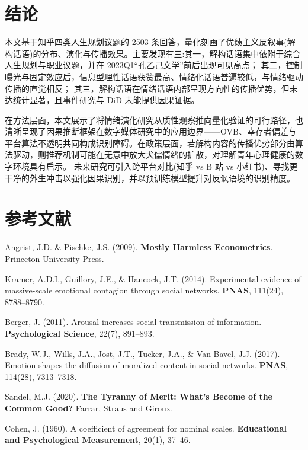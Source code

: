 \documentclass[11pt,a4paper]{ctexart}
\begin{document}
\section{结论}

本文基于知乎四类人生规划议题的 2503 条回答，量化刻画了优绩主义反叙事(解构话语)的分布、演化与传播效果。主要发现有三:其一，解构话语集中依附于综合人生规划与职业议题，并在 2023Q1“孔乙己文学”前后出现可见高点；
其二，控制曝光与固定效应后，信息型理性话语获赞最高、情绪化话语普遍较低，与情绪驱动传播的直觉相反；
其三，解构话语在情绪话语内部呈现方向性的传播优势，但未达统计显著，且事件研究与 DiD 未能提供因果证据。

在方法层面，本文展示了将情绪演化研究从质性观察推向量化验证的可行路径，也清晰呈现了因果推断框架在数字媒体研究中的应用边界——OVB、幸存者偏差与平台算法不透明共同构成识别障碍。在政策层面，若解构内容的传播优势部分由算法驱动，则推荐机制可能在无意中放大犬儒情绪的扩散，对理解青年心理健康的数字环境具有启示。
未来研究可引入跨平台对比(知乎 vs B 站 vs 小红书)、寻找更干净的外生冲击以强化因果识别，并以预训练模型提升对反讽语境的识别精度。

\newpage
\section*{参考文献}
\begin{enumerate}[leftmargin=1.6em,itemsep=1pt,label={[\arabic*]}]
  \item Angrist, J.D. \& Pischke, J.S. (2009). \textbf{Mostly Harmless Econometrics}. Princeton University Press.
  \item Kramer, A.D.I., Guillory, J.E., \& Hancock, J.T. (2014). Experimental evidence of massive-scale emotional contagion through social networks. \textbf{PNAS}, 111(24), 8788--8790.
  \item Berger, J. (2011). Arousal increases social transmission of information. \textbf{Psychological Science}, 22(7), 891--893.
  \item Brady, W.J., Wills, J.A., Jost, J.T., Tucker, J.A., \& Van Bavel, J.J. (2017). Emotion shapes the diffusion of moralized content in social networks. \textbf{PNAS}, 114(28), 7313--7318.
  \item Sandel, M.J. (2020). \textbf{The Tyranny of Merit: What's Become of the Common Good?} Farrar, Straus and Giroux.
  \item Cohen, J. (1960). A coefficient of agreement for nominal scales. \textbf{Educational and Psychological Measurement}, 20(1), 37--46.
\end{enumerate}
\end{document}
